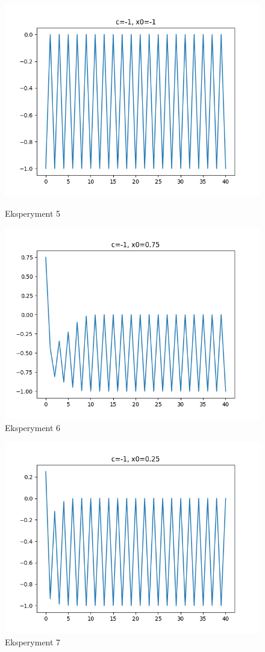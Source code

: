 \documentclass[12pt]{article}
\begin{document}
\begin{figure}[!htb]
  \includegraphics[width=\linewidth]{5.png}
  \caption{Eksperyment 5}
\endminipage\hfill
{}
  \includegraphics[width=\linewidth]{6.png}
  \caption{Eksperyment 6}
\endminipage
\end{figure}

\newpage
\begin{figure}[!hbt]
	\centering
	\includegraphics[width=0.6\linewidth]{7.png}
  \caption{Eksperyment 7}
\end{figure}
\end{document}
